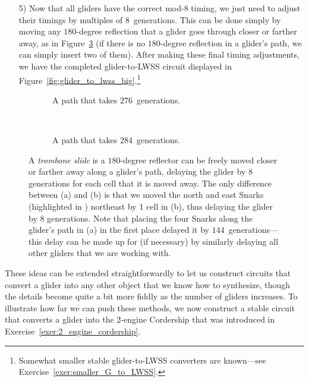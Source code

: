 \begin{itemize}
	\item[5)] Now that all gliders have the correct mod-$8$ timing, we just need to adjust their timings by multiples of $8$~generations. This can be done simply by moving any $180$-degree reflection that a glider goes through closer or farther away, as in Figure~\ref{fig:trombone_slide} (if there is no $180$-degree reflection in a glider's path, we can simply insert two of them). After making these final timing adjustments, we have the completed glider-to-LWSS circuit displayed in Figure~\ref{fig:glider_to_lwss_big}.\footnote{Somewhat smaller stable glider-to-LWSS converters are known---see Exercise~\ref{exer:smaller_G_to_LWSS}.}\medskip
\end{itemize}

\begin{figure}[!htb]
	\centering
	\begin{subfigure}{.48\textwidth}
		\centering
		\caption{A path that takes $276$~generations.}\label{fig:trombone_slide_276}
	\end{subfigure} \ \ \ \ %
	\begin{subfigure}{.48\textwidth}
		\centering
		\caption{A path that takes $284$~generations.}
		\label{fig:trombone_slide_284}
	\end{subfigure}
	\caption{A \emph{trombone slide} is a $180$-degree reflector can be freely moved closer or farther away along a glider's path, delaying the glider by $8$ generations for each cell that it is moved away. The only difference between (a) and (b) is that we moved the north and east Snarks (highlighted in ) northeast by 1 cell in (b), thus delaying the glider by $8$ generations. Note that placing the four Snarks along the glider's path in (a) in the first place delayed it by $144$~generations---this delay can be made up for (if necessary) by similarly delaying all other gliders that we are working with.}\label{fig:trombone_slide}
\end{figure}

These ideas can be extended straightforwardly to let us construct circuits that convert a glider into any other object that we know how to synthesize, though the details become quite a bit more fiddly as the number of gliders increases. To illustrate how far we can push these methods, we now construct a stable circuit that converts a glider into the 2-engine Cordership that was introduced in Exercise~\ref{exer:2_engine_cordership}.

